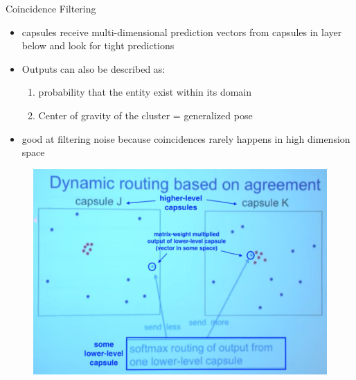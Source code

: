 \documentclass{beamer}
\begin{document}
\begin{frame}{Coincidence Filtering}
    \begin{itemize}
        \item capsules receive multi-dimensional prediction vectors from capsules in layer below and look for tight predictions
        \item Outputs can also be described as:
        \begin{enumerate}
            
            \item probability that the entity exist within its domain
            \item Center of gravity of the cluster = generalized pose
        \end{enumerate}
        \item good at filtering noise because coincidences rarely happens in high dimension space
    \end{itemize}
    \begin{figure}
        \centering
        \includegraphics[scale = 0.4]{dr_agreement.JPG}
    \end{figure}
\end{frame}
\end{document}
